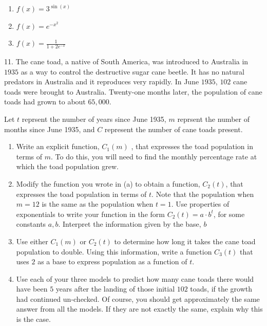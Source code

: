 \documentclass[10pt,]{book}
\theoremstyle{plain}
\theoremstyle{definition}
\theoremstyle{definition}
\theoremstyle{definition}
\numberwithin{equation}{section}
\begin{document}
\begin{exerciselist}
\begin{enumerate}[label=(\alph*)]
\item\hypertarget{li-164}{}\(f(x)=3^{\sin(x)}\)%
\item\hypertarget{li-165}{}\(f(x)=e^{-x^2}\)%
\item\hypertarget{li-166}{}\(f(x)=\frac{1}{1+2e^{-x}}\)%
\end{enumerate}
\par\smallskip
\item[11.]\hypertarget{exercise-72}{}\hypertarget{p-270}{}%
The cane toad, a native of South America, was introduced to Australia in \(1935\) as a way to control the destructive sugar cane beetle.  It has no natural predators in Australia and it reproduces very rapidly.  In June \(1935\), \(102\) cane toads were brought to Australia.  Twenty-one months later, the population of cane toads had grown to about \(65,000\).%
\par
\hypertarget{p-271}{}%
Let \(t\) reprsent the number of years since June 1935, \(m\) reprsent the number of months since June 1935, and \(C\) represent the number of cane toads present.%
\leavevmode%
\begin{enumerate}[label=(\alph*)]
\item\hypertarget{li-167}{}Write an explicit function, \(C_1(m)\) , that expresses the toad population in terms of \(m\). To do this, you will need to find the monthly percentage rate at which the toad population grew.%
\item\hypertarget{li-168}{}Modify the function you wrote in (a) to obtain a function,  \(C_2(t)\), that expresses the toad population in terms of \(t\). Note that the population when \(m = 12\) is the same as the population when \(t = 1\).  Use properties of exponentials to write your function in the form \(C_2(t)=a \cdot b^t\), for some constants \(a, b\).  Interpret the information given by the base, \(b\)%
\item\hypertarget{li-169}{}Use either  \(C_1(m)\)  or \(C_2(t)\) to determine how long it takes the cane toad population to double.  Using this information, write a function \(C_3(t)\) that uses \(2\) as a base to express population as a function of \(t\).%
\item\hypertarget{li-170}{}Use each of your three models to predict how many cane toads there would have been \(5\) years after the landing of those initial \(102\) toads, if the growth had continued un-checked.  Of course, you should get approximately the same answer from all the models.  If they are not exactly the same, explain why this is the case.%

\end{enumerate}
\end{exerciselist}
\end{document}
